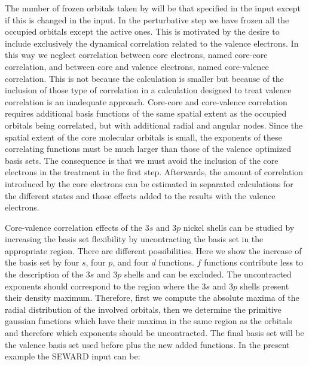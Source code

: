 
The number of frozen orbitals taken by  will be that specified in the  input
except if this is changed in the  input. In the perturbative step
we have frozen all the occupied orbitals except the active ones. This is motivated by
the desire to include exclusively the dynamical correlation related to the valence
electrons. In this way we neglect correlation between core electrons, named core-core
correlation, and between core and valence electrons, named core-valence correlation.
This is not because the calculation is smaller but because of the inclusion of those
type of correlation in a calculation designed to treat valence correlation is an 
inadequate approach. Core-core and core-valence correlation requires additional basis
functions of the same spatial extent as the occupied orbitals being correlated, but
with additional radial and angular nodes. Since the spatial extent of the core 
molecular orbitals is small, the exponents of these correlating functions must be
much larger than those of the valence optimized basis sets. The consequence is that
we must avoid the inclusion of the core electrons in the treatment in the first step.
Afterwards, the amount of correlation introduced by the core electrons can be estimated
in separated calculations for the different states and those effects added to the
results with the valence electrons.


Core-valence correlation effects of the $3s$ and $3p$ nickel shells can be studied by
increasing the basis set flexibility by uncontracting the
basis set in the appropriate region. There are different possibilities. Here we show
the increase of the basis set by four $s$, four $p$, and four $d$ functions. $f$
functions contribute less to the description of the $3s$ and $3p$ shells and can be
excluded. The uncontracted exponents should correspond to the region where the $3s$
and $3p$ shells present their density maximum. Therefore, first we compute the absolute
maxima of the radial distribution of the involved orbitals, then we determine the primitive
gaussian functions which have their maxima in the same region as the orbitals and therefore
which exponents should be uncontracted. The final basis set will be the valence basis set
used before plus the new added functions. In the present example the SEWARD
input can be:

